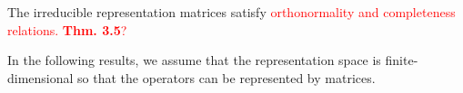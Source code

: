 \begin{example}

\end{example}

The irreducible representation matrices satisfy \textcolor{red}{orthonormality and completeness relations.\textbf{ Thm. 3.5}?}

In the following results, we assume that the representation space is finite-dimensional so that the operators can be represented by matrices.


